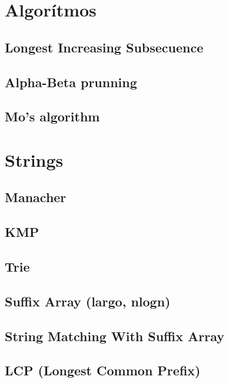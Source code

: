 \section{Algorítmos}%
\subsection{Longest Increasing Subsecuence}
\subsection{Alpha-Beta prunning}
\subsection{Mo's algorithm}


\section{Strings}%
\subsection{Manacher}
\subsection{KMP}
\subsection{Trie}
\subsection{Suffix Array (largo, nlogn)}
\subsection{String Matching With Suffix Array}
\subsection{LCP (Longest Common Prefix)}
